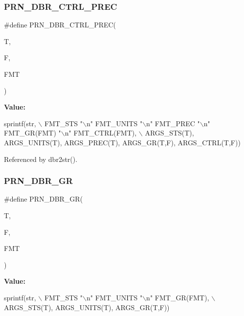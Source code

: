 \subsubsection{P\+R\+N\+\_\+\+D\+B\+R\+\_\+\+C\+T\+R\+L\+\_\+\+P\+R\+EC}
{\footnotesize\ttfamily \#define P\+R\+N\+\_\+\+D\+B\+R\+\_\+\+C\+T\+R\+L\+\_\+\+P\+R\+EC(\begin{DoxyParamCaption}\item[{}]{T,  }\item[{}]{F,  }\item[{}]{F\+MT }\end{DoxyParamCaption})}

{\bfseries Value\+:}
\begin{DoxyCode}
sprintf(str,                                                                        \(\backslash\)
    FMT_STS \textcolor{stringliteral}{"\(\backslash\)n"} FMT_UNITS \textcolor{stringliteral}{"\(\backslash\)n"} FMT_PREC \textcolor{stringliteral}{"\(\backslash\)n"} FMT_GR(FMT) \textcolor{stringliteral}{"\(\backslash\)n"} FMT_CTRL(FMT),   \(\backslash\)
    ARGS_STS(T), ARGS_UNITS(T), ARGS_PREC(T), ARGS_GR(T,F),    ARGS_CTRL(T,F))
\end{DoxyCode}


Referenced by dbr2str().

\mbox{\label{cuepics-world_8cpp_a43d963aa4a72306b9eb999354dbea088}} 
\subsubsection{P\+R\+N\+\_\+\+D\+B\+R\+\_\+\+GR}
{\footnotesize\ttfamily \#define P\+R\+N\+\_\+\+D\+B\+R\+\_\+\+GR(\begin{DoxyParamCaption}\item[{}]{T,  }\item[{}]{F,  }\item[{}]{F\+MT }\end{DoxyParamCaption})}

{\bfseries Value\+:}
\begin{DoxyCode}
sprintf(str,                                        \(\backslash\)
    FMT_STS \textcolor{stringliteral}{"\(\backslash\)n"} FMT_UNITS \textcolor{stringliteral}{"\(\backslash\)n"} FMT_GR(FMT),    \(\backslash\)
    ARGS_STS(T), ARGS_UNITS(T), ARGS_GR(T,F))
\end{DoxyCode}


